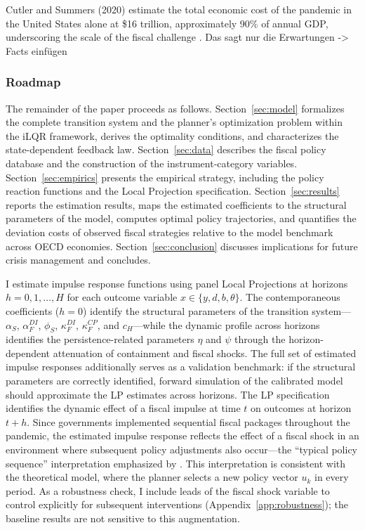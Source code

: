 Cutler and Summers (2020) estimate the total economic cost of the pandemic in the
United States alone at \$16 trillion, approximately 90\% of annual GDP, underscoring the
scale of the fiscal challenge \citep{CutlerSummers2020}. Das sagt nur die Erwartungen -> Facts einfügen




\subsubsection*{Roadmap}

The remainder of the paper proceeds as follows. Section~\ref{sec:model}
formalizes the complete transition system and the planner's optimization problem
within the iLQR framework, derives the optimality conditions, and characterizes
the state-dependent feedback law. Section~\ref{sec:data} describes the fiscal
policy database and the construction of the instrument-category variables.
Section~\ref{sec:empirics} presents the empirical strategy, including the policy
reaction functions and the Local Projection specification.
Section~\ref{sec:results} reports the estimation results, maps the estimated
coefficients to the structural parameters of the model, computes optimal policy
trajectories, and quantifies the deviation costs of observed fiscal strategies
relative to the model benchmark across OECD economies.
Section~\ref{sec:conclusion} discusses implications for future crisis management
and concludes.

I estimate impulse response functions using panel Local Projections
\citep{jorda2005, jorda2025} at horizons $h = 0, 1, \ldots, H$ for each
outcome variable $x \in \{y, d, b, \theta\}$. The contemporaneous
coefficients ($h = 0$) identify the structural parameters of the transition
system---$\alpha_S$, $\alpha_F^{DI}$, $\phi_S$, $\kappa_F^{DI}$,
$\kappa_F^{CP}$, and $c_H$---while the dynamic profile across horizons
identifies the persistence-related parameters $\eta$ and $\psi$ through
the horizon-dependent attenuation of containment and fiscal shocks. The
full set of estimated impulse responses additionally serves as a
validation benchmark: if the structural parameters are correctly
identified, forward simulation of the calibrated model should approximate
the LP estimates across horizons.
The LP specification identifies the dynamic effect of a fiscal impulse at
time $t$ on outcomes at horizon $t+h$. Since governments implemented
sequential fiscal packages throughout the pandemic, the estimated impulse
response reflects the effect of a fiscal shock in an environment where
subsequent policy adjustments also occur---the ``typical policy sequence''
interpretation emphasized by \citet{jorda2025}. This interpretation is
consistent with the theoretical model, where the planner selects a new
policy vector $u_k$ in every period. As a robustness check, I include
leads of the fiscal shock variable to control explicitly for subsequent
interventions (Appendix~\ref{app:robustness}); the baseline results are
not sensitive to this augmentation.


